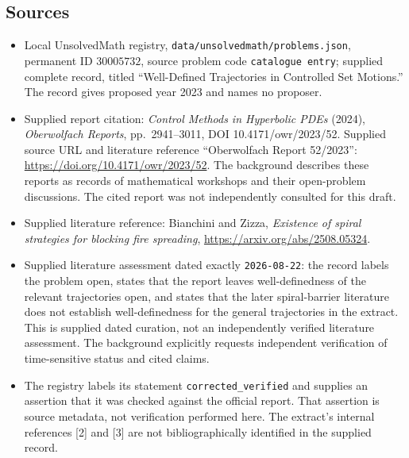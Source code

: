 \documentclass[11pt]{article}
\begin{document}
\subsection{Sources}
\begin{itemize}
\item Local UnsolvedMath registry, \texttt{data/unsolvedmath/problems.json}, permanent ID \(30005732\), source problem code \texttt{catalogue entry}; supplied complete record, titled ``Well-Defined Trajectories in Controlled Set Motions.'' The record gives proposed year 2023 and names no proposer.
\item Supplied report citation: \emph{Control Methods in Hyperbolic PDEs} (2024), \emph{Oberwolfach Reports}, pp.\ 2941--3011, DOI 10.4171/owr/2023/52. Supplied source URL and literature reference ``Oberwolfach Report 52/2023'': \url{https://doi.org/10.4171/owr/2023/52}. The background describes these reports as records of mathematical workshops and their open-problem discussions. The cited report was not independently consulted for this draft.
\item Supplied literature reference: Bianchini and Zizza, \emph{Existence of spiral strategies for blocking fire spreading}, \url{https://arxiv.org/abs/2508.05324}.
\item Supplied literature assessment dated exactly \texttt{2026-08-22}: the record labels the problem open, states that the report leaves well-definedness of the relevant trajectories open, and states that the later spiral-barrier literature does not establish well-definedness for the general trajectories in the extract. This is supplied dated curation, not an independently verified literature assessment. The background explicitly requests independent verification of time-sensitive status and cited claims.
\item The registry labels its statement \texttt{corrected\_verified} and supplies an assertion that it was checked against the official report. That assertion is source metadata, not verification performed here. The extract's internal references [2] and [3] are not bibliographically identified in the supplied record.
\end{itemize}
\end{document}
